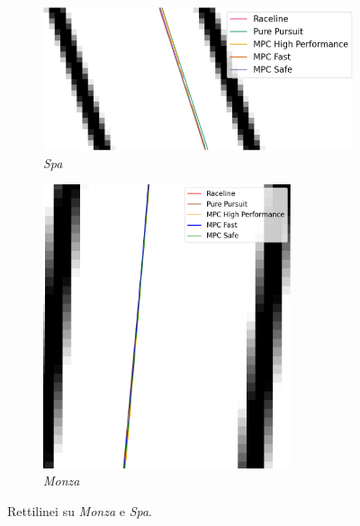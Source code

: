 \begin{figure}[H]
    \centering
    \begin{subfigure}[b]{0.49\textwidth}
        \centering
        \includegraphics[width=\textwidth]{images/spa_trajectory_comparison_straight.png} 
        \caption{\textit{Spa}}
        \label{fig:str_spa}
    \end{subfigure}
    \hfill
    \begin{subfigure}[b]{0.49\textwidth}
        \centering
        \includegraphics[width=0.8\textwidth]{images/monza_trajectory_comparison_straight.png}
        \caption{\textit{Monza}}
        \label{fig:str_monza}
    \end{subfigure}
    \caption{Rettilinei su \textit{Monza} e \textit{Spa}.}
    \label{fig:fig16} %
\end{figure}

